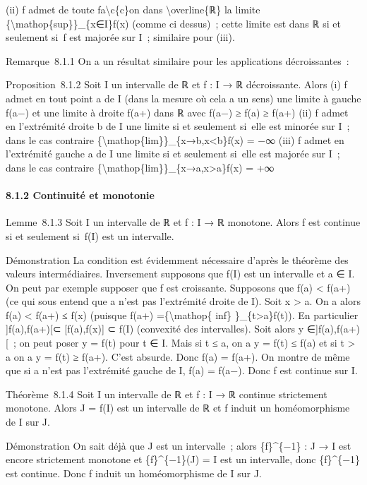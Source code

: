 \documentclass[]{article}
\begin{document}
(ii) f admet de toute fa\textbackslash{}c\{c\}on dans
\textbackslash{}overline\{ℝ\} la limite
\{\textbackslash{}mathop\{sup\}\}\_\{x∈I\}f(x) (comme ci dessus)~; cette
limite est dans ℝ si et seulement si~f est majorée sur I~; similaire
pour (iii).

Remarque~8.1.1 On a un résultat similaire pour les applications
décroissantes~:

Proposition~8.1.2 Soit I un intervalle de ℝ et f : I → ℝ décroissante.
Alors (i) f admet en tout point a de I (dans la mesure où cela a un
sens) une limite à gauche f(a−) et une limite à droite f(a+) dans ℝ avec
f(a−) ≥ f(a) ≥ f(a+) (ii) f admet en l'extrémité droite b de I une
limite si et seulement si~elle est minorée sur I~; dans le cas contraire
\{\textbackslash{}mathop\{lim\}\}\_\{x→b,x\textless{}b\}f(x) = −∞ (iii)
f admet en l'extrémité gauche a de I une limite si et seulement si~elle
est majorée sur I~; dans le cas contraire
\{\textbackslash{}mathop\{lim\}\}\_\{x→a,x\textgreater{}a\}f(x) = +∞

\paragraph{8.1.2 Continuité et monotonie}

Lemme~8.1.3 Soit I un intervalle de ℝ et f : I → ℝ monotone. Alors f est
continue si et seulement si~f(I) est un intervalle.

Démonstration La condition est évidemment nécessaire d'après le théorème
des valeurs intermédiaires. Inversement supposons que f(I) est un
intervalle et a ∈ I. On peut par exemple supposer que f est croissante.
Supposons que f(a) \textless{} f(a+) (ce qui sous entend que a n'est pas
l'extrémité droite de I). Soit x \textgreater{} a. On a alors f(a)
\textless{} f(a+) ≤ f(x) (puisque f(a+) =\{\textbackslash{}mathop\{
inf\} \}\_\{t\textgreater{}a\}f(t)). En particulier {]}f(a),f(a+){[}⊂
{[}f(a),f(x){]} ⊂ f(I) (convexité des intervalles). Soit alors y
∈{]}f(a),f(a+){[}~; on peut poser y = f(t) pour t ∈ I. Mais si t ≤ a, on
a y = f(t) ≤ f(a) et si t \textgreater{} a on a y = f(t) ≥ f(a+). C'est
absurde. Donc f(a) = f(a+). On montre de même que si a n'est pas
l'extrémité gauche de I, f(a) = f(a−). Donc f est continue sur I.

Théorème~8.1.4 Soit I un intervalle de ℝ et f : I → ℝ continue
strictement monotone. Alors J = f(I) est un intervalle de ℝ et f induit
un homéomorphisme de I sur J.

Démonstration On sait déjà que J est un intervalle~; alors
\{f\}\^{}\{−1\} : J → I est encore strictement monotone et
\{f\}\^{}\{−1\}(J) = I est un intervalle, donc \{f\}\^{}\{−1\} est
continue. Donc f induit un homéomorphisme de I sur J.
\end{document}
